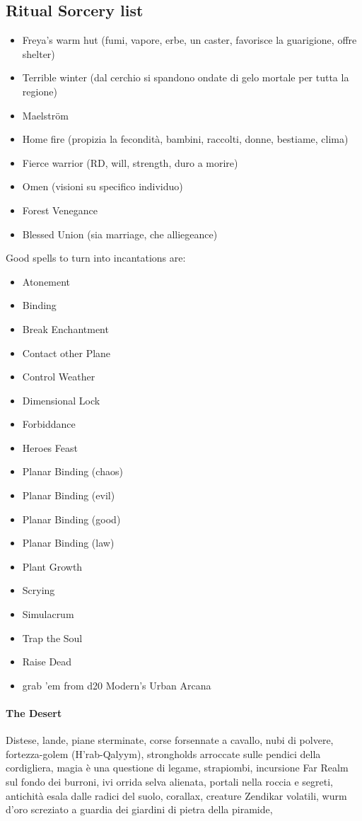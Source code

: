 \documentclass[10pt,a4paper]{article}
\begin{document}
\subsection{Ritual Sorcery list}
\begin{itemize}
\item Freya's warm hut (fumi, vapore, erbe, un caster, favorisce la guarigione, offre shelter)
\item Terrible winter (dal cerchio si spandono ondate di gelo mortale per tutta la regione)
\item Maelstr\"{o}m
\item Home fire (propizia la fecondit\`{a}, bambini, raccolti, donne, bestiame, clima)
\item Fierce warrior (RD, will, strength, duro a morire)
\item Omen (visioni su specifico individuo)
\item Forest Venegance
\item Blessed Union (sia marriage, che alliegeance)
\end{itemize}

\pagebreak
Good spells to turn into incantations are:
\begin{itemize}
\item Atonement
\item Binding
\item Break Enchantment
\item Contact other Plane
\item Control Weather
\item Dimensional Lock
\item Forbiddance
\item Heroes Feast
\item Planar Binding (chaos)
\item Planar Binding (evil)
\item Planar Binding (good)
\item Planar Binding (law)
\item Plant Growth
\item Scrying
\item Simulacrum
\item Trap the Soul
\item Raise Dead
\item grab 'em from d20 Modern's Urban Arcana
\end{itemize}




\paragraph{The Desert} Distese, lande, piane sterminate, corse forsennate a cavallo, nubi di polvere, fortezza-golem (H'rab-Qalyym), strongholds arroccate sulle pendici della cordigliera, magia \`{e} una questione di legame, strapiombi, incursione Far Realm sul fondo dei burroni, ivi orrida selva alienata, portali nella roccia e segreti, antichit\`{a} esala dalle radici del suolo, corallax, creature Zendikar volatili, wurm d'oro screziato a guardia dei giardini di pietra della piramide, 
\end{document}
